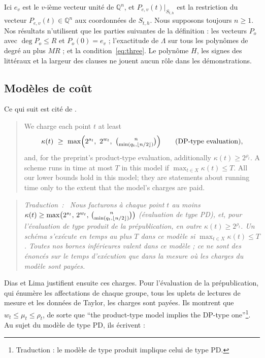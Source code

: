 \documentclass[11pt,a4paper]{article}
\makeatletter
\theoremstyle{definition}
\theoremstyle{remark}
\newcommand{\Q}{\mathbb{Q}}
\newcommand{\englishhyph}{\@ifundefined{l@english}{}{\language\l@english}}
\newcommand{\eng}[1]{{\englishhyph #1}}
\newenvironment{dlquote}{\begin{quote}\englishhyph}{\end{quote}}
\newenvironment{dltrad}{\begin{quote}\itshape\textup{Traduction~:}\ \ignorespaces}{\end{quote}}
\makeatother
\begin{document}
Ici $e_v$ est le $v$-ième vecteur unité de $\Q^n$, et $P_{e,v}(t)|_{S_{t,h}}$ est la
restriction du vecteur $P_{e,v}(t)\in\Q^n$ aux coordonnées de $S_{t,h}$. Nous supposons
toujours $n\ge1$. Nos résultats n'utilisent que les parties suivantes de la définition : les
vecteurs $P_o$ avec $\deg P_o\le R$ et $P_o(0)=e_v$ ; l'exactitude de $\Lambda$ sur tous les
polynômes de degré au plus $MR$ ; et la condition~\eqref{eq:three}. Le polynôme $H$, les
signes des littéraux et la largeur des clauses ne jouent aucun rôle dans les démonstrations.

\subsection{Modèles de coût}\label{sec:cost}

Ce qui suit est cité de \cite[Section~5.2]{DL}.

\begin{dlquote}
We charge each point $t$ at least
\[
\kappa(t)\ \ge\ \max\Bigl(2^{s_t},\ 2^{w_t},\ \tbinom{n}{\min(q_t,\lfloor n/2\rfloor)}\Bigr)
\qquad\text{(DP-type evaluation)},
\]
and, for the preprint's product-type evaluation, additionally $\kappa(t)\ge2^{\rho_t}$. A
scheme runs in time at most $T$ in this model if $\max_{t\in X}\kappa(t)\le T$. All our lower
bounds hold in this model; they are statements about running time only to the extent that the
model's charges are paid.
\end{dlquote}

\begin{dltrad}
Nous facturons à chaque point $t$ au moins
$\kappa(t)\ge\max\bigl(2^{s_t},\,\allowbreak 2^{w_t},\,\allowbreak\tbinom{n}{\min(q_t,\lfloor n/2\rfloor)}\bigr)$
(évaluation de type PD), et, pour l'évaluation de type produit de la prépublication, en
outre $\kappa(t)\ge2^{\rho_t}$. Un schéma s'exécute en temps au plus $T$ dans ce modèle si
$\max_{t\in X}\kappa(t)\le T$. Toutes nos bornes inférieures valent dans ce modèle ; ce ne
sont des énoncés sur le temps d'exécution que dans la mesure où les charges du modèle sont
payées.
\end{dltrad}

Dias et Lima justifient ensuite ces charges. Pour l'évaluation de la prépublication, qui
énumère les affectations de chaque groupe, tous les uplets de lectures de mesure et les
données de Taylor, les charges sont payées. Ils montrent que $w_t\le\mu_t\le\rho_t$, de sorte
que \eng{``the product-type model implies the DP-type one''}\footnote{Traduction : \og le
modèle de type produit implique celui de type PD\fg{}.}. Au sujet du modèle de type PD, ils
écrivent :
\end{document}
